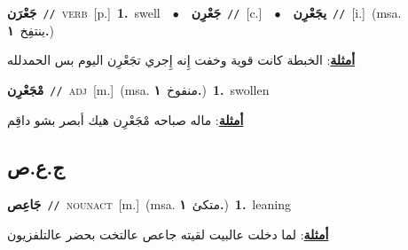\documentclass[10pt,a4paper,twoside]{article} %
\begin{document}
\begin{multicols}{2}
{\setlength\topsep{0pt}\textbf{\foreignlanguage{arabic}{جَعْرَن}}\ {\color{gray}\texttt{//}\color{black}}\ \textsc{verb}\ [p.]\ \textbf{1.}~swell\ \ $\bullet$\ \ \setlength\topsep{0pt}\textbf{\foreignlanguage{arabic}{جَعْرِن}}\ {\color{gray}\texttt{//}\color{black}}\ [c.]\ \ $\bullet$\ \ \setlength\topsep{0pt}\textbf{\foreignlanguage{arabic}{يجَعْرِن}}\ {\color{gray}\texttt{//}\color{black}}\ [i.]\ \color{gray}(msa. \foreignlanguage{arabic}{ينتفِخ}~\foreignlanguage{arabic}{\textbf{١.}})\color{black}\  \begin{flushright}\color{gray}\foreignlanguage{arabic}{\textbf{\underline{\foreignlanguage{arabic}{أمثلة}}}: الخبطة كانت قوية وخفت إِنه إِجري تجَعْرِن اليوم بس الحمدلله}\end{flushright}\color{black}} \vspace{2mm}

{\setlength\topsep{0pt}\textbf{\foreignlanguage{arabic}{مْجَعْرِن}}\ {\color{gray}\texttt{//}\color{black}}\ \textsc{adj}\ [m.]\ \color{gray}(msa. \foreignlanguage{arabic}{منفوخ}~\foreignlanguage{arabic}{\textbf{١.}})\color{black}\ \textbf{1.}~swollen\  \begin{flushright}\color{gray}\foreignlanguage{arabic}{\textbf{\underline{\foreignlanguage{arabic}{أمثلة}}}: ماله صباحه مْجَعْرِن هيك أبصر بشو داقِم}\end{flushright}\color{black}} \vspace{2mm}

\vspace{-3mm}
\subsection*{\color{blue}\foreignlanguage{arabic}{ج.ع.ص}\color{blue}{}} 

{\setlength\topsep{0pt}\textbf{\foreignlanguage{arabic}{جَاعِص}}\ {\color{gray}\texttt{//}\color{black}}\ \textsc{noun\textunderscore act}\ [m.]\ \color{gray}(msa. \foreignlanguage{arabic}{متكئ}~\foreignlanguage{arabic}{\textbf{١.}})\color{black}\ \textbf{1.}~leaning\  \begin{flushright}\color{gray}\foreignlanguage{arabic}{\textbf{\underline{\foreignlanguage{arabic}{أمثلة}}}: لما دخلت عالبيت لقيته جاعص عالتخت بحضر عالتلفزيون}\end{flushright}\color{black}} \vspace{2mm}


\end{multicols}
\end{document}
